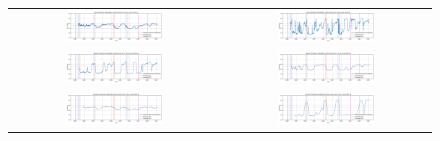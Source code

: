 \begin{figure}[H]
    \raggedright
    \begin{tabular}{c c}
        \includegraphics[width=0.48\textwidth]{Steps/Plots/Daily Predicted Probability of Recession Over Time using LSTM_4.png} &
        \includegraphics[width=0.48\textwidth]{Steps/Plots/Daily Predicted Probability of Recession Over Time using LSTM_8.png} \\ [-9pt]
        \includegraphics[width=0.48\textwidth]{Steps/Plots/Weekly Predicted Probability of Recession Over Time using LSTM_4.png} &
        \includegraphics[width=0.48\textwidth]{Steps/Plots/Weekly Predicted Probability of Recession Over Time using LSTM_8.png} \\ [-9pt]
        \includegraphics[width=0.48\textwidth]{Steps/Plots/Monthly Predicted Probability of Recession Over Time using LSTM_4.png} &
        \includegraphics[width=0.48\textwidth]{Steps/Plots/Monthly Predicted Probability of Recession Over Time using LSTM_8.png} \\

\end{tabular}
\end{figure}
